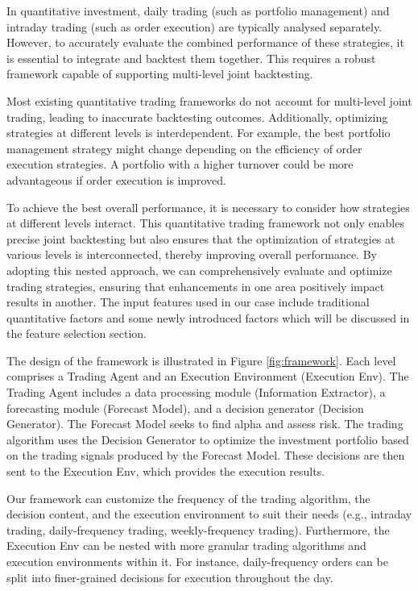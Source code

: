 \documentclass[conference]{IEEEtran}
\begin{document}
In quantitative investment, daily trading (such as portfolio management) and intraday trading (such as order execution) are typically analysed separately. However, to accurately evaluate the combined performance of these strategies, it is essential to integrate and backtest them together. This requires a robust framework capable of supporting multi-level joint backtesting.

Most existing quantitative trading frameworks do not account for multi-level joint trading, leading to inaccurate backtesting outcomes. Additionally, optimizing strategies at different levels is interdependent. For example, the best portfolio management strategy might change depending on the efficiency of order execution strategies. A portfolio with a higher turnover could be more advantageous if order execution is improved.

To achieve the best overall performance, it is necessary to consider how strategies at different levels interact. This quantitative trading framework not only enables precise joint backtesting but also ensures that the optimization of strategies at various levels is interconnected, thereby improving overall performance. By adopting this nested approach, we can comprehensively evaluate and optimize trading strategies, ensuring that enhancements in one area positively impact results in another. The input features used in our case include traditional quantitative factors and some newly introduced factors which will be discussed in the feature selection section.

The design of the framework is illustrated in Figure \ref{fig:framework}. Each level comprises a Trading Agent and an Execution Environment (Execution Env). The Trading Agent includes a data processing module (Information Extractor), a forecasting module (Forecast Model), and a decision generator (Decision Generator). The Forecast Model seeks to find alpha and assess risk. The trading algorithm uses the Decision Generator to optimize the investment portfolio based on the trading signals produced by the Forecast Model. These decisions are then sent to the Execution Env, which provides the execution results.

Our framework can customize the frequency of the trading algorithm, the decision content, and the execution environment to suit their needs (e.g., intraday trading, daily-frequency trading, weekly-frequency trading). Furthermore, the Execution Env can be nested with more granular trading algorithms and execution environments within it. For instance, daily-frequency orders can be split into finer-grained decisions for execution throughout the day.
\end{document}
